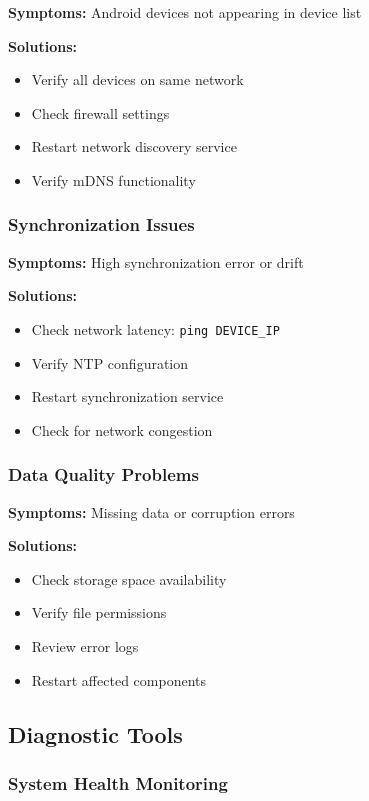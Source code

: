 \textbf{Symptoms:} Android devices not appearing in device list

\textbf{Solutions:}
\begin{itemize}
\item Verify all devices on same network
\item Check firewall settings
\item Restart network discovery service
\item Verify mDNS functionality
\end{itemize}

\subsubsection{Synchronization Issues}

\textbf{Symptoms:} High synchronization error or drift

\textbf{Solutions:}
\begin{itemize}
\item Check network latency: \texttt{ping DEVICE\_IP}
\item Verify NTP configuration
\item Restart synchronization service
\item Check for network congestion
\end{itemize}

\subsubsection{Data Quality Problems}

\textbf{Symptoms:} Missing data or corruption errors

\textbf{Solutions:}
\begin{itemize}
\item Check storage space availability
\item Verify file permissions
\item Review error logs
\item Restart affected components
\end{itemize}

\subsection{Diagnostic Tools}

\subsubsection{System Health Monitoring}

